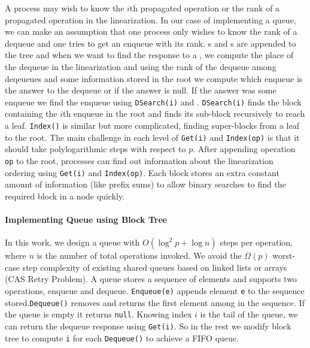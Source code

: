 \documentclass[10pt]{article}
\newcommand{\nf}[1]{{\normalfont{\texttt{#1}}}}
\theoremstyle{definition}
\begin{document}
A process may wish to know the $i$th propagated operation or the rank of a propagated operation in the linearization. In our case of implementing a queue, we can make an assumption that one process only wishes to know the rank of a dequeue and one tries to get an enqueue with its rank. \nf{enqueue}s and \nf{dequeue}s are appended to the tree and when we want to find the response to a \nf{dequeue}, we compute the place of the dequeue in the linearization and using the rank of the dequeue among deqeueues and some information stored in the root we compute which enqueue is the answer to the dequeue or if the answer is null. If the answer was some enqueue we find the enqueue using \texttt{DSearch(i)} and \nf{GetENQ(n,b,i)}. \texttt{DSearch(i)} finds the block containing the $i$th enqueue in the root and \nf{GetENQ(n,b,i)} finds its sub-block recursively to reach a leaf. \texttt{Index()} is similar but more complicated, finding super-blocks from a leaf to the root. The main challenge in each level of \texttt{Get(i)} and \texttt{Index(op)} is that it should take polylogarithmic steps with respect to $p$. After appending operation \texttt{op} to the root, processes can find out information about the linearization ordering using \texttt{Get(i)} and \texttt{Index(op)}. Each block stores an extra constant amount of information (like prefix sums) to allow binary searches to find the required block in a node quickly.

\paragraph{Implementing Queue using Block Tree}
In this work, we design a queue with $O(\log^2 p +\log n)$ steps per operation, where $n$ is the number of total operations invoked. We avoid the $\Omega(p)$ worst-case step complexity of existing shared queues based on linked lists or arrays (CAS Retry Problem). A queue stores a sequence of elements and supports two operations, enqueue and dequeue. \texttt{Enqueue(e)} appends element \texttt{e} to the sequence stored.\texttt{Dequeue()} removes and returns the first element among in the sequence. If the queue is empty it returns \texttt{null}. Knowing index $i$ is the tail of the queue, we can return the dequeue response using \texttt{Get(i)}.  So in the rest we modify block tree to compute \texttt{i} for each \texttt{Dequeue()} to achieve a FIFO queue.
\end{document}
